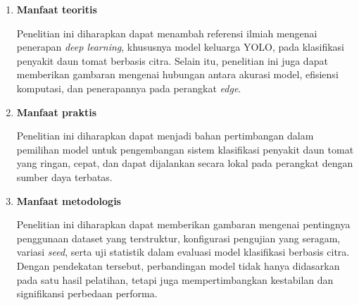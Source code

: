 \begin{sectioncontent}
\begin{subsectioncontent}
        \begin{enumerate}[leftmargin=0.75cm,label=\arabic*.]
            \newpage
            \item \textbf{Manfaat teoritis}\par
            Penelitian ini diharapkan dapat menambah referensi ilmiah mengenai penerapan \textit{deep learning}, khususnya model keluarga YOLO, pada klasifikasi penyakit daun tomat berbasis citra. Selain itu, penelitian ini juga dapat memberikan gambaran mengenai hubungan antara akurasi model, efisiensi komputasi, dan penerapannya pada perangkat \textit{edge}.

            \item \textbf{Manfaat praktis}\par
            Penelitian ini diharapkan dapat menjadi bahan pertimbangan dalam pemilihan model untuk pengembangan sistem klasifikasi penyakit daun tomat yang ringan, cepat, dan dapat dijalankan secara lokal pada perangkat dengan sumber daya terbatas.

            \item \textbf{Manfaat metodologis}\par
            Penelitian ini diharapkan dapat memberikan gambaran mengenai pentingnya penggunaan dataset yang terstruktur, konfigurasi pengujian yang seragam, variasi \textit{seed}, serta uji statistik dalam evaluasi model klasifikasi berbasis citra. Dengan pendekatan tersebut, perbandingan model tidak hanya didasarkan pada satu hasil pelatihan, tetapi juga mempertimbangkan kestabilan dan signifikansi perbedaan performa.
        \end{enumerate}
    \end{subsectioncontent}
\end{sectioncontent}

